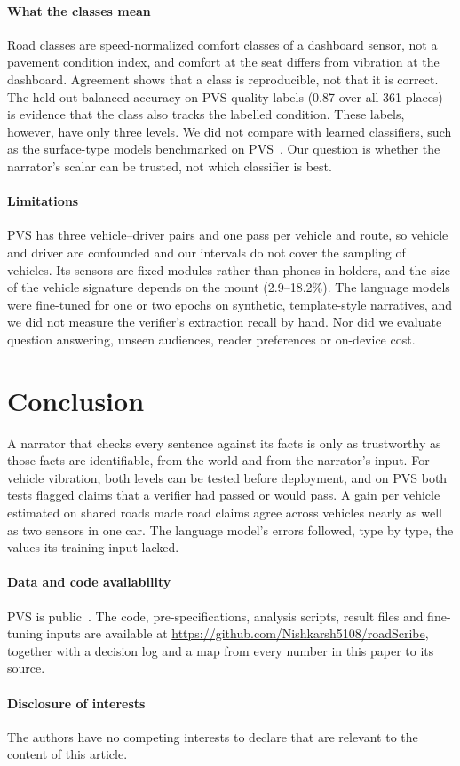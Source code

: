 \paragraph*{What the classes mean}
Road classes are speed-normalized comfort classes of a dashboard sensor, not a pavement condition index, and comfort at the seat differs from vibration at the dashboard.
Agreement shows that a class is reproducible, not that it is correct.
The held-out balanced accuracy on PVS quality labels (0.87 over all 361 places) is evidence that the class also tracks the labelled condition. These labels, however, have only three levels.
We did not compare with learned classifiers, such as the surface-type models benchmarked on PVS~\cite{menegazzo2021pvs}. Our question is whether the narrator's scalar can be trusted, not which classifier is best.

\paragraph*{Limitations}
PVS has three vehicle--driver pairs and one pass per vehicle and route, so vehicle and driver are confounded and our intervals do not cover the sampling of vehicles.
Its sensors are fixed modules rather than phones in holders, and the size of the vehicle signature depends on the mount (2.9--18.2\%).
The language models were fine-tuned for one or two epochs on synthetic, template-style narratives, and we did not measure the verifier's extraction recall by hand.
Nor did we evaluate question answering, unseen audiences, reader preferences or on-device cost.

\section{Conclusion}
\label{sec:conclusion}
A narrator that checks every sentence against its facts is only as trustworthy as those facts are identifiable, from the world and from the narrator's input.
For vehicle vibration, both levels can be tested before deployment, and on PVS both tests flagged claims that a verifier had passed or would pass.
A gain per vehicle estimated on shared roads made road claims agree across vehicles nearly as well as two sensors in one car.
The language model's errors followed, type by type, the values its training input lacked.

\paragraph*{Data and code availability}
PVS is public~\cite{menegazzo2021pvs}.
The code, pre-specifications, analysis scripts, result files and fine-tuning inputs are available at \url{https://github.com/Nishkarsh5108/roadScribe}, together with a decision log and a map from every number in this paper to its source.

\paragraph*{Disclosure of interests}
The authors have no competing interests to declare that are relevant to the content of this article.
